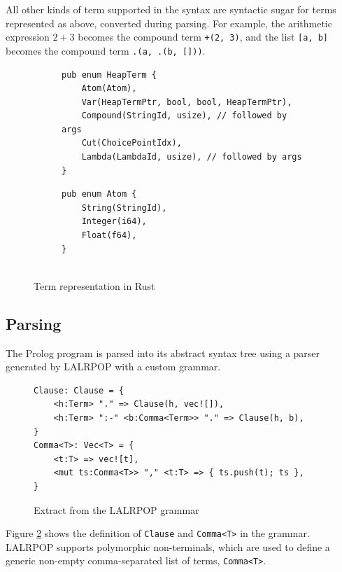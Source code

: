 All other kinds of term supported in the syntax are syntactic sugar for terms represented as above, converted during parsing. For example, the arithmetic expression $2 + 3$ becomes the compound term \texttt{+(2, 3)}, and the list \texttt{[a, b]} becomes the compound term \texttt{.(a, .(b, []))}.

\begin{figure}[H]
\centering
\begin{subfigure}{0.7\textwidth}
\centering
\begin{verbatim}
pub enum HeapTerm {
    Atom(Atom),
    Var(HeapTermPtr, bool, bool, HeapTermPtr),
    Compound(StringId, usize), // followed by args
    Cut(ChoicePointIdx),
    Lambda(LambdaId, usize), // followed by args
}
\end{verbatim}
\end{subfigure}%
\begin{subfigure}{0.3\textwidth}
\centering
\begin{verbatim}
pub enum Atom {
    String(StringId),
    Integer(i64),
    Float(f64),
}


\end{verbatim}
\end{subfigure}
\caption{Term representation in Rust}
\label{fig:rust-term-representation}
\end{figure}

\subsection{Parsing}

The Prolog program is parsed into its abstract syntax tree using a parser generated by LALRPOP \cite{thelalrpopprojectdevelopersLALRPOPhttpsgithubcom2015} with a custom grammar.

\begin{figure}[H]
\centering
\begin{verbatim}
Clause: Clause = {
    <h:Term> "." => Clause(h, vec![]),
    <h:Term> ":-" <b:Comma<Term>> "." => Clause(h, b),
}
Comma<T>: Vec<T> = {
    <t:T> => vec![t],
    <mut ts:Comma<T>> "," <t:T> => { ts.push(t); ts },
}
\end{verbatim}
\caption{Extract from the LALRPOP grammar}
\label{fig:grammar}
\end{figure}

\vspace*{-1.5em}

Figure \ref{fig:grammar} shows the definition of \texttt{Clause} and \texttt{Comma<T>} in the grammar. LALRPOP supports polymorphic non-terminals, which are used to define a generic non-empty comma-separated list of terms, \texttt{Comma<T>}.

